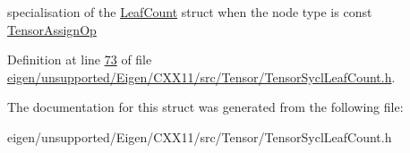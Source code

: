 specialisation of the \hyperlink{struct_eigen_1_1_tensor_sycl_1_1internal_1_1_leaf_count}{Leaf\+Count} struct when the node type is const \hyperlink{class_eigen_1_1_tensor_assign_op}{Tensor\+Assign\+Op} 

Definition at line \hyperlink{eigen_2unsupported_2_eigen_2_c_x_x11_2src_2_tensor_2_tensor_sycl_leaf_count_8h_source_l00073}{73} of file \hyperlink{eigen_2unsupported_2_eigen_2_c_x_x11_2src_2_tensor_2_tensor_sycl_leaf_count_8h_source}{eigen/unsupported/\+Eigen/\+C\+X\+X11/src/\+Tensor/\+Tensor\+Sycl\+Leaf\+Count.\+h}.



The documentation for this struct was generated from the following file\+:\begin{DoxyCompactItemize}
\item 
eigen/unsupported/\+Eigen/\+C\+X\+X11/src/\+Tensor/\+Tensor\+Sycl\+Leaf\+Count.\+h\end{DoxyCompactItemize}
